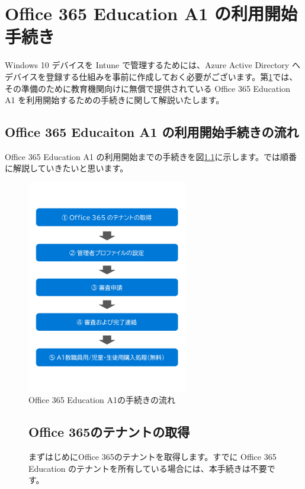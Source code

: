 \chapter{Office 365 Education A1 の利用開始手続き}\label{cap:M365A1}

Windows 10 デバイスを Intune で管理するためには、Azure Active Directory へデバイスを登録する仕組みを事前に作成しておく必要がございます。第\ref{cap:M365A1}では、その準備のために教育機関向けに無償で提供されている Office 365 Education A1 を利用開始するための手続きに関して解説いたします。

\section{Office 365 Educaiton A1 の利用開始手続きの流れ}

Office 365 Education A1 の利用開始までの手続きを図\ref{fig:O365A1}に示します。では順番に解説していきたいと思います。

\begin{figure}[h]
    \centering
    \includegraphics[width=7cm]{figures/O365A1.png}
    \caption{Office 365 Education A1の手続きの流れ}
    \label{fig:O365A1}
\end{figure}

\newpage 

\begin{figure}[h]
    \begin{minipage}{1.0\textwidth}
        \section{Office 365のテナントの取得}
        \label{sec:Office365テナント取得}
            まずはじめにOffice 365のテナントを取得します。すでに Office 365 Education のテナントを所有している場合には、本手続きは不要です。
    \end{minipage}
\end{figure}

